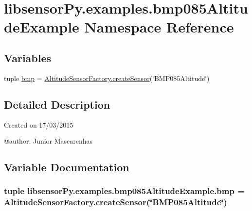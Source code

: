 \hypertarget{namespacelibsensorPy_1_1examples_1_1bmp085AltitudeExample}{}\section{libsensor\+Py.\+examples.\+bmp085\+Altitude\+Example Namespace Reference}
\label{namespacelibsensorPy_1_1examples_1_1bmp085AltitudeExample}
\subsection*{Variables}
\begin{DoxyCompactItemize}
\item 
tuple \hyperlink{namespacelibsensorPy_1_1examples_1_1bmp085AltitudeExample_ad79731cc6f415fd32e59170e551065ae}{bmp} = \hyperlink{classconcretefactory_1_1altitudeSensorFactory_1_1AltitudeSensorFactory_a9c77491290cc1495655080099863c61b}{Altitude\+Sensor\+Factory.\+create\+Sensor}(\char`\"{}B\+M\+P085\+Altitude\char`\"{})
\end{DoxyCompactItemize}


\subsection{Detailed Description}
\begin{DoxyVerb}Created on 17/03/2015

@author: Junior Mascarenhas
\end{DoxyVerb}
 

\subsection{Variable Documentation}
\hypertarget{namespacelibsensorPy_1_1examples_1_1bmp085AltitudeExample_ad79731cc6f415fd32e59170e551065ae}{}
\subsubsection[{bmp}]{\setlength{\rightskip}{0pt plus 5cm}tuple libsensor\+Py.\+examples.\+bmp085\+Altitude\+Example.\+bmp = {\bf Altitude\+Sensor\+Factory.\+create\+Sensor}(\char`\"{}B\+M\+P085\+Altitude\char`\"{})}\label{namespacelibsensorPy_1_1examples_1_1bmp085AltitudeExample_ad79731cc6f415fd32e59170e551065ae}
